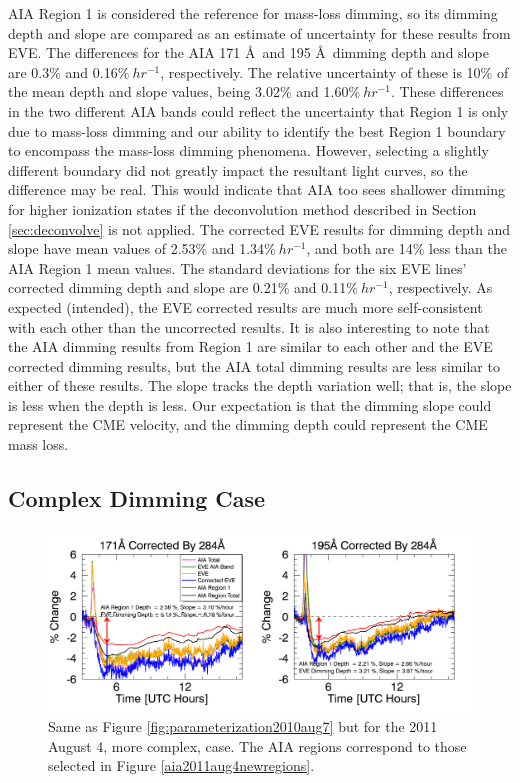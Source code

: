 AIA Region 1 is considered the reference for mass-loss dimming, so its dimming depth and slope are compared as an estimate of uncertainty for these results from EVE. The differences for the AIA 171 \AA\ and 195 \AA\ dimming depth and slope are 0.3\% and 0.16$\%\ hr^{-1}$, respectively. The relative uncertainty of these is 10\% of the mean depth and slope values, being 3.02\% and 1.60$\%\ hr^{-1}$. These differences in the two different AIA bands could reflect the uncertainty that Region 1 is only due to mass-loss dimming and our ability to identify the best Region 1 boundary to encompass the mass-loss dimming phenomena. However, selecting a slightly different boundary did not greatly impact the resultant light curves, so the difference may be real. This would indicate that AIA too sees shallower dimming for higher ionization states if the deconvolution method described in Section \ref{sec:deconvolve} is not applied. The corrected EVE results for dimming depth and slope have mean values of 2.53\% and 1.34$\%\ hr^{-1}$, and both are 14\% less than the AIA Region 1 mean values. The standard deviations for the six EVE lines’ corrected dimming depth and slope are 0.21\% and 0.11$\%\ hr^{-1}$, respectively. As expected (intended), the EVE corrected results are much more self-consistent with each other than the uncorrected results. It is also interesting to note that the AIA dimming results from Region 1 are similar to each other and the EVE corrected dimming results, but the AIA total dimming results are less similar to either of these results. The slope tracks the depth variation well; that is, the slope is less when the depth is less. Our expectation is that the dimming slope could represent the CME velocity, and the dimming depth could represent the CME mass loss. 

\subsection{Complex Dimming Case}

\begin{figure}[!h]
    \begin{center}
	    \includegraphics[width=166mm]{Images/EveCorrectionResults2011Aug4.png}
    \end{center}
    \caption[Dimming parameterization for 2011 August 4 event]{
        Same as Figure \ref{fig:parameterization2010aug7} but for the 2011 August 4, more complex, case. The AIA regions
        correspond to those selected in Figure \ref{aia2011aug4newregions}. 
   	}
    \label{fig:parameterization2011aug4}
\end{figure}


